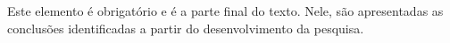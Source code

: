 \documentclass[
        oneside, %
        english,
        brazil
        ]{abntbibufjf}
\begin{document}
Este elemento \'e obrigatório e \'e a parte final do texto.  Nele, são apresentadas as conclus\~oes identificadas a partir do desenvolvimento da pesquisa.



\postextual



\end{document}
